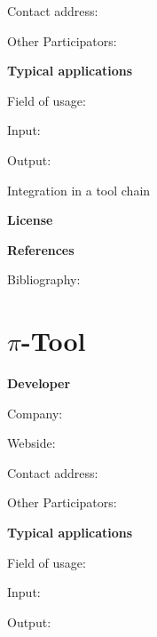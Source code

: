 \documentclass{./template/openetcs_report}
\begin{document}
	Contact address:

	Other  Participators:



	\textbf{Typical applications}

	Field of usage:


	Input:

	Output:





	Integration in a tool chain



	\textbf{License}


	\textbf{References}

	Bibliography:


\section{$\pi$-Tool}

	\textbf{Developer}

	Company: 

	Webside:

	Contact address:

	Other  Participators:



	\textbf{Typical applications}

	Field of usage:


	Input:

	Output:



\end{document}
